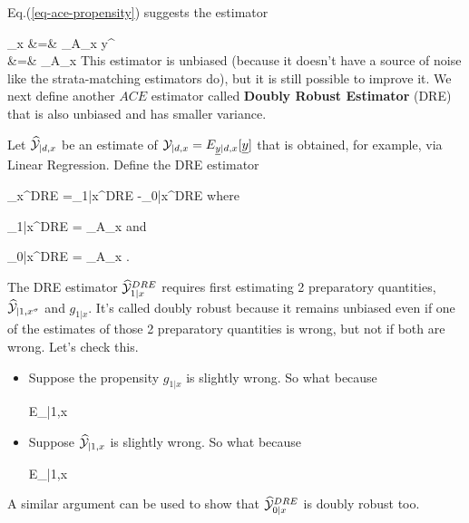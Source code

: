 Eq.(\ref{eq-ace-propensity})
 suggests the estimator 

\beqa
{}_x
&=&
\sum_{\s\in A_x}
y^\s
{}
\\
&=&
\sum_{\s \in A_x}
\label{eq-ace-esti-posi}
\eeqa
This 
estimator is unbiased
(because it doesn't
have a source
of noise like the
strata-matching
estimators do),
but it is still possible to
improve it.
We next 
define
another $ACE$ estimator
called
{\bf Doubly Robust Estimator} (DRE)
that is also 
unbiased and has smaller
variance.

Let
$\widehat{{\cal Y}}_{|d, x}$
be an estimate
of ${\cal Y}_{|d, x}
=E_{{\underline{y}}|d,x}[{\underline{y}}]$
that is 
obtained, for
example, via Linear Regression.
Define the DRE estimator

\beq
{}_x^{DRE}
=\widehat{\caly}_{1|x}^{DRE}
-\widehat{\caly}_{0|x}^{DRE}
\eeq
where 

\beq
\widehat{\caly}_{1|x}^{DRE}
=
\sum_{\s\in A_x}
\eeq
and

\beq
\widehat{\caly}_{0|x}^{DRE}
=
\sum_{\s\in A_x}
\;.
\eeq

The DRE estimator
$\widehat{{\cal Y}}_{1|x}^{DRE}$ 
requires first
estimating
2 preparatory quantities,
 $\widehat{{\cal Y}}_{|1, x^\sigma}$
and $g_{1|x}$.
It's 
called doubly robust
because it 
remains unbiased
even if one
of the
estimates 
of those 2 
preparatory quantities is wrong, 
but not if
both are wrong.
Let's check this.

\begin{itemize}
\item Suppose the propensity
$g_{1|x}$ is slightly wrong.
So what because


\beq
E_{\s|1,x}
\eeq

\item Suppose 
$\widehat{{\cal Y}}_{|1, x}$ is 
slightly wrong. So what because

\beq
E_{\s|1,x}
\eeq

\end{itemize}A similar argument
can be used
to show that
$\widehat{{\cal Y}}_{0|x}^{DRE}$ 
is doubly robust too.


